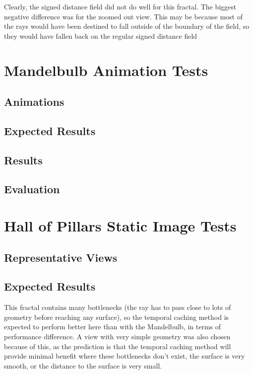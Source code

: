 Clearly, the signed distance field did not do well for this fractal. The biggest negative difference was for the zoomed out view. This may be because most of the rays would have been destined to fall outside of the boundary of the field, so they would have fallen back on the regular signed distance field

\section{Mandelbulb Animation Tests}

\subsection{Animations}

\subsection{Expected Results}

\subsection{Results}

\subsection{Evaluation}

\section{Hall of Pillars Static Image Tests}

\subsection{Representative Views}

\subsection{Expected Results}

This fractal contains many bottlenecks (the ray has to pass close to lots of geometry before reaching any surface), so the temporal caching method is expected to perform better here than with the Mandelbulb, in terms of performance difference. A view with very simple geometry was also chosen because of this, as the prediction is that the temporal caching method will provide minimal benefit where these bottlenecks don't exist, the surface is very smooth, or the distance to the surface is very small.\newline


